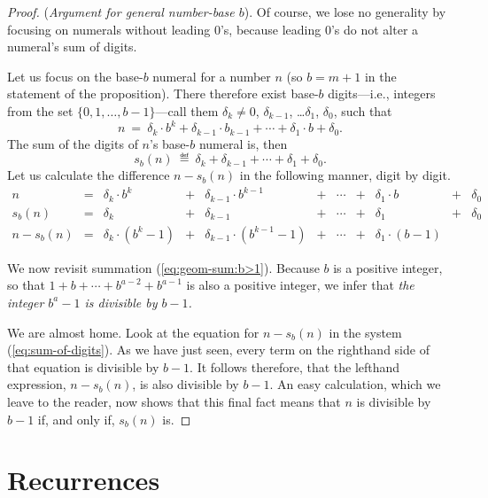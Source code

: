 \begin{proof}
({\it Argument for general number-base $b$}).
%
Of course, we lose no generality by focusing on numerals without
leading $0$'s, because leading $0$'s do not alter a numeral's sum of
digits.

Let us focus on the base-$b$ numeral for a number $n$ (so $b = m+1$ in
the statement of the proposition).  There therefore exist base-$b$
digits---i.e., integers from the set $\{0, 1, \ldots, b-1\}$---call
them $\delta_k \neq 0$, $\delta_{k-1}$, \ldots $\delta_1$, $\delta_0$,
such that
\[ n \ = \ \delta_k \cdot b^k + \delta_{k-1} \cdot b_{k-1} + \cdots +
\delta_1 \cdot b + \delta_0. \]
The sum of the digits of $n$'s base-$b$ numeral is, then
\[ s_b(n) \ \eqdef \ \delta_k + \delta_{k-1} + \cdots + \delta_1 +
\delta_0. \]
Let us calculate the difference $n - s_b(n)$ in the following manner,
digit by digit.
\begin{equation}
\label{eq:sum-of-digits}
\begin{array}{ccccccccccc}
n & = &
\delta_k \cdot b^k & + & \delta_{k-1} \cdot b^{k-1} & + & \cdots
  & + & \delta_1 \cdot b & + & \delta_0 \\
s_b(n) & = &
\delta_k & + & \delta_{k-1} & + & \cdots & + & \delta_1 & + & \delta_0 \\
\hline
n - s_b(n) & = &
\delta_k \cdot (b^k -1) & + &
\delta_{k-1} \cdot (b^{k-1} -1) & + &
\cdots & + &
\delta_1 \cdot (b-1) & & 
\end{array}
\end{equation}

\medskip

We now revisit summation (\ref{eq:geom-sum:b>1}).  Because $b$ is a
positive integer, so that $1 + b + \cdots + b^{a-2} + b^{a-1}$ is also
a positive integer, we infer that {\em the integer $b^a -1$ is
  divisible by $b-1$.}

We are almost home.  Look at the equation for $n - s_b(n)$ in the
system (\ref{eq:sum-of-digits}).  As we have just seen, every term on
the righthand side of that equation is divisible by $b-1$.  It follows
therefore, that the lefthand expression, $n - s_b(n)$, is also
divisible by $b-1$.
An easy calculation, which we leave to the reader, now shows that this
final fact means that $n$ is divisible by $b-1$ if, and only if,
$s_b(n)$ is.
\end{proof}




\section{Recurrences}



